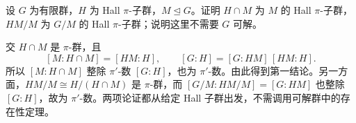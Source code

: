 \begin{exercise}\label{b1:ex:C-hall-normal-section}
	设 \(G\) 为有限群，\(H\) 为 Hall \(\pi\)-子群，\(M\trianglelefteq G\)。证明 \(H\cap M\) 为 \(M\) 的 Hall \(\pi\)-子群，\(HM/M\) 为 \(G/M\) 的 Hall \(\pi\)-子群；说明这里不需要 \(G\) 可解。
\end{exercise}

\begin{solution}
	交 \(H\cap M\) 是 \(\pi\)-群，且
	\[
		[M:H\cap M]=[HM:H],\qquad
		[G:H]=[G:HM]\,[HM:H].
	\]
	所以 \([M:H\cap M]\) 整除 \(\pi'\)-数 \([G:H]\)，也为 \(\pi'\)-数。由此得到第一结论。另一方面，\(HM/M\cong H/(H\cap M)\) 是 \(\pi\)-群，而 \([G/M:HM/M]=[G:HM]\) 也整除 \([G:H]\)，故为 \(\pi'\)-数。两项论证都从给定 Hall 子群出发，不需调用可解群中的存在性定理。
\end{solution}
